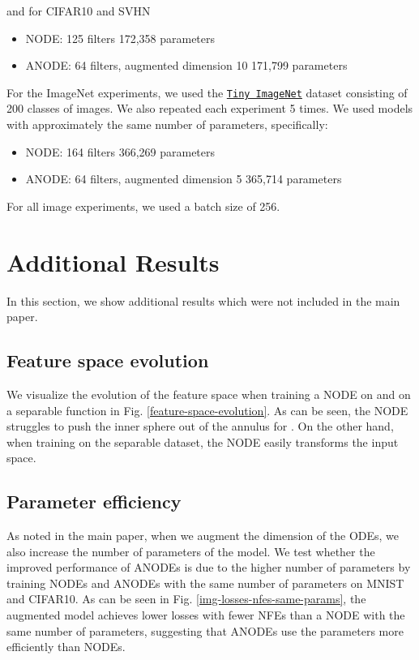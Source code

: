 \documentclass{article}
\begin{document}
and for CIFAR10 and SVHN

\begin{itemize}
    \item NODE: 125 filters  172,358 parameters
    \item ANODE: 64 filters, augmented dimension 10  171,799 parameters
\end{itemize}

For the ImageNet experiments, we used the \href{https://tiny-imagenet.herokuapp.com/}{\texttt{Tiny ImageNet}} dataset consisting of 200 classes of  images. We also repeated each experiment 5 times. We used models with approximately the same number of parameters, specifically:

\begin{itemize}
    \item NODE: 164 filters  366,269 parameters
    \item ANODE: 64 filters, augmented dimension 5  365,714 parameters
\end{itemize}

For all image experiments, we used a batch size of 256.

\section{Additional Results}

In this section, we show additional results which were not included in the main paper.

\subsection{Feature space evolution}

We visualize the evolution of the feature space when training a NODE on  and on a separable function in Fig. \ref{feature-space-evolution}. As can be seen, the NODE struggles to push the inner sphere out of the annulus for . On the other hand, when training on the separable dataset, the NODE easily transforms the input space.

\subsection{Parameter efficiency}

As noted in the main paper, when we augment the dimension of the ODEs, we also increase the number of parameters of the model. We test whether the improved performance of ANODEs is due to the higher number of parameters by training NODEs and ANODEs with the same number of parameters on MNIST and CIFAR10. As can be seen in Fig. \ref{img-losses-nfes-same-params}, the augmented model achieves lower losses with fewer NFEs than a NODE with the same number of parameters, suggesting that ANODEs use the parameters more efficiently than NODEs.
\end{document}
